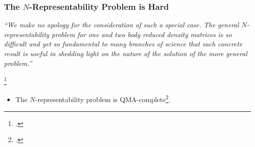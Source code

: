 \documentclass[
    9pt,
    hyperref={bookmarks=false, colorlinks=false}, %
    xcolor={dvipsnames},
]{beamer}
\begin{document}
\begin{frame}
    \frametitle{The $N$-Representability Problem is Hard}
    \begin{alertblock}{}
        \textit{``We make no apology for the consideration of such a special case. The general $N$-representability problem for one and two body reduced density matrices is so difficult and yet so fundamental to many branches of science that each concrete result is useful in shedding light on the nature of the solution of the more general problem.''}\footnotemark{}
        \hspace*{}
    \end{alertblock}
    \footcitetext{borland1972conditions}
    \begin{itemize}
        \item The $N$-representability problem is QMA-complete\footcite{liu2007quantum}.
    \end{itemize}
\end{frame}
\end{document}
